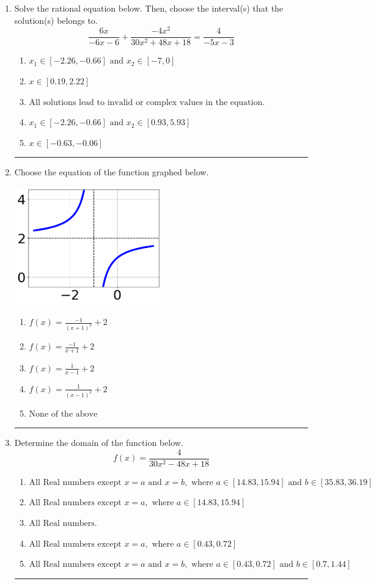 \documentclass[14pt]{extbook}
\newcommand{\litem}[1]{\item#1\hspace*{-1cm}\rule{\textwidth}{0.4pt}}
\begin{document}
\begin{enumerate}
{\begin{enumerate}[label=\Alph*.]
\end{enumerate} }
\litem{
Solve the rational equation below. Then, choose the interval(s) that the solution(s) belongs to.\[ \frac{6x}{-6x -6} + \frac{-4x^{2}}{30x^{2} +48 x + 18} = \frac{4}{-5x -3} \]\begin{enumerate}[label=\Alph*.]
\item \( x_1 \in [-2.26, -0.66] \text{ and } x_2 \in [-7,0] \)
\item \( x \in [0.19,2.22] \)
\item \( \text{All solutions lead to invalid or complex values in the equation.} \)
\item \( x_1 \in [-2.26, -0.66] \text{ and } x_2 \in [0.93,5.93] \)
\item \( x \in [-0.63,-0.06] \)

\end{enumerate} }
\litem{
Choose the equation of the function graphed below.
\begin{center}
    \includegraphics[width=0.5\textwidth]{../Figures/rationalGraphToEquationCopyC.png}
\end{center}
\begin{enumerate}[label=\Alph*.]
\item \( f(x) = \frac{-1}{(x + 1)^2} + 2 \)
\item \( f(x) = \frac{-1}{x + 1} + 2 \)
\item \( f(x) = \frac{1}{x - 1} + 2 \)
\item \( f(x) = \frac{1}{(x - 1)^2} + 2 \)
\item \( \text{None of the above} \)

\end{enumerate} }
\litem{
Determine the domain of the function below.\[ f(x) = \frac{4}{30x^{2} -48 x + 18} \]\begin{enumerate}[label=\Alph*.]
\item \( \text{All Real numbers except } x = a \text{ and } x = b, \text{ where } a \in [14.83, 15.94] \text{ and } b \in [35.83, 36.19] \)
\item \( \text{All Real numbers except } x = a, \text{ where } a \in [14.83, 15.94] \)
\item \( \text{All Real numbers.} \)
\item \( \text{All Real numbers except } x = a, \text{ where } a \in [0.43, 0.72] \)
\item \( \text{All Real numbers except } x = a \text{ and } x = b, \text{ where } a \in [0.43, 0.72] \text{ and } b \in [0.7, 1.44] \)


\end{enumerate}}
\end{enumerate}
\end{document}
